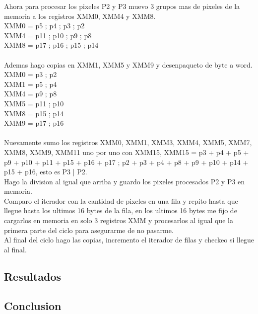 Ahora para procesar los pixeles P2 y P3 muevo 3 grupos mas de pixeles de la memoria a los registros XMM0, XMM4 y XMM8. \\
	XMM0 = p5 ; p4 ; p3 ; p2 \\
	XMM4 = p11 ; p10 ; p9 ; p8 \\
	XMM8 = p17 ; p16 ; p15 ; p14 \\
\\
Ademas hago copias en XMM1, XMM5 y XMM9 y desenpaqueto de byte a word. \\
	XMM0 = p3 ; p2 \\
 	XMM1 = p5 ; p4 \\
	XMM4 = p9 ; p8 \\
	XMM5 = p11 ; p10 \\
 	XMM8 = p15 ; p14 \\
	XMM9 = p17 ; p16 \\
\\
Nuevamente sumo los registros XMM0, XMM1, XMM3, XMM4, XMM5, XMM7, XMM8, XMM9, XMM11 uno por uno con XMM15, XMM15 = p3 + p4 + p5 + p9 + p10 + p11 + p15 + p16 + p17 ; p2 + p3 + p4 + p8 + p9 + p10 + p14 + p15 + p16, esto es P3 | P2. \\

Hago la division al igual que arriba y guardo los pixeles procesados P2 y P3 en memoria. \\

Comparo el iterador con la cantidad de pixeles en una fila y repito hasta que llegue hasta los ultimos 16 bytes de la fila, en los ultimos 16 bytes me fijo de cargarlos en memoria en solo 3 registros XMM y procesarlos al igual que la primera parte del ciclo para asegurarme de no pasarme. \\

Al final del ciclo hago las copias, incremento el iterador de filas y checkeo si llegue al final. \\

\subsection{Resultados}


\subsection{Conclusion}